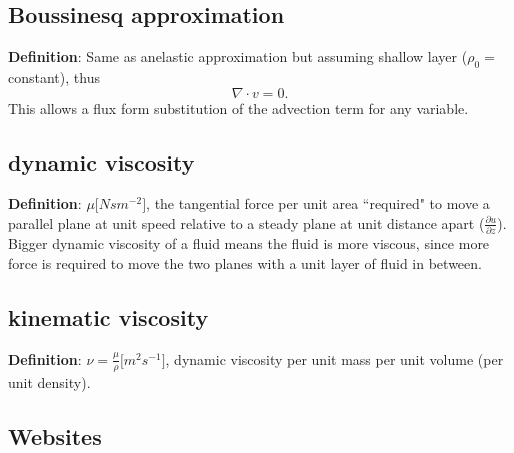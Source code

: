 \subsection{Boussinesq approximation}
{\bf Definition}: Same as anelastic approximation but assuming shallow layer ($\rho_0 = $ constant),
thus
\begin{equation}
   \nabla \cdot v = 0.
\end{equation}
This allows a flux form substitution of the advection term for any variable.

\subsection{dynamic viscosity}
{\bf Definition}: $\mu \big[ N s m^{-2}\big]$, the tangential force per unit area ``required" to
move a parallel plane at unit speed relative to a steady plane at unit distance apart
($\frac{\partial u}{\partial z}$). Bigger dynamic viscosity of a fluid means the fluid is more
viscous, since more force is required to move the two planes with a unit layer of fluid in between.

\subsection{kinematic viscosity}
{\bf Definition}: $\nu = \frac{\mu}{\rho} \big[ m^2 s^{-1}\big]$, dynamic viscosity per unit mass per unit volume (per
unit density). 


%
\subsection{Websites}


